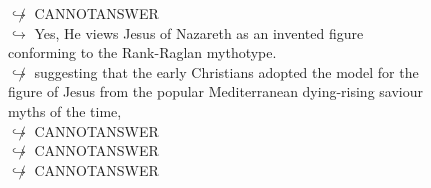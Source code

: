 \documentclass[11pt,a4paper, onecolumn]{article}
\begin{document}
\begin{figure}[t] \small \begin{tcolorbox}[boxsep=0pt,left=5pt,right=0pt,top=2pt,colback = yellow!5] \begin{dialogue}
 \small 
\colorbox{pink!25}{$\not\hookrightarrow$}
{ CANNOTANSWER }
\\
\colorbox{pink!25}{$\hookrightarrow$}
\colorbox{red!25}{Yes,}
{ He views Jesus of Nazareth as an invented figure conforming to the Rank-Raglan mythotype. }
\\
\colorbox{pink!25}{$\not\hookrightarrow$}
{ suggesting that the early Christians adopted the model for the figure of Jesus from the popular Mediterranean dying-rising saviour myths of the time, }
\\
\colorbox{pink!25}{$\not\hookrightarrow$}
{ CANNOTANSWER }
\\
\colorbox{pink!25}{$\not\hookrightarrow$}
{ CANNOTANSWER }
\\
\colorbox{pink!25}{$\not\hookrightarrow$}
{ CANNOTANSWER }
\\
 \end{dialogue}\end{tcolorbox}\end{figure}
\end{document}
